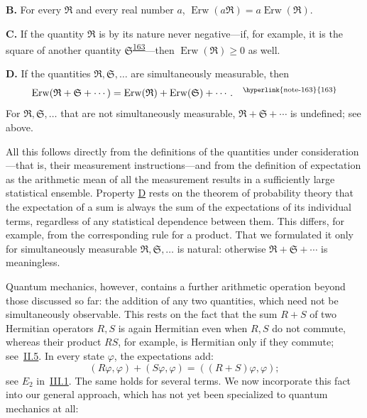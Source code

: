 \documentclass[fontsize=13pt,twoside,openany,headings=normal,parskip=false,bookmarkpackage=false,DIV=calc]{scrbook}
\begin{document}
\noindent{}\textbf{B.}\label{cond:IV.1.B} For every $\mathfrak R$ and every real number $a$, $\operatorname{Erw}(a\mathfrak R)=a\operatorname{Erw}(\mathfrak R)$.

\hypertarget{origpage-164}{}%
\noindent{}\textbf{C.}\label{cond:IV.1.C} If the quantity $\mathfrak R$ is by its nature never negative---if, for example, it is the square of another quantity $\mathfrak S$\textsuperscript{\hyperlink{note-163}{163}}---then $\operatorname{Erw}(\mathfrak R)\geq0$ as well.

\noindent{}\textbf{D.}\label{cond:IV.1.D} If the quantities $\mathfrak R,\mathfrak S,\ldots$ are simultaneously measurable, then
\[
\operatorname{Erw}(\mathfrak R+\mathfrak S+\cdots)=\operatorname{Erw}(\mathfrak R)+\operatorname{Erw}(\mathfrak S)+\cdots.
\quad\text{\textsuperscript{\hyperlink{note-163}{163}}}
\]
For $\mathfrak R,\mathfrak S,\ldots$ that are not simultaneously measurable, $\mathfrak R+\mathfrak S+\cdots$ is undefined; see above.

All this follows directly from the definitions of the quantities under consideration---that is, their measurement instructions---and from the definition of expectation as the arithmetic mean of all the measurement results in a sufficiently large statistical ensemble. Property \hyperref[cond:IV.1.D]{D} rests on the theorem of probability theory that the expectation of a sum is always the sum of the expectations of its individual terms, regardless of any statistical dependence between them. This differs, for example, from the corresponding rule for a product. That we formulated it only for simultaneously measurable $\mathfrak R,\mathfrak S,\ldots$ is natural: otherwise $\mathfrak R+\mathfrak S+\cdots$ is meaningless.

Quantum mechanics, however, contains a further arithmetic operation beyond those discussed so far: the addition of any two quantities, which need not be simultaneously observable. This rests on the fact that the sum $R+S$ of two Hermitian operators $R,S$ is again Hermitian even when $R,S$ do not commute, whereas their product $RS$, for example, is Hermitian only if they commute; see~\hyperref[sec:II.5]{II.5}. In every state $\varphi$, the expectations add:
\[
(R\varphi,\varphi)+(S\varphi,\varphi)=((R+S)\varphi,\varphi);
\]
see \hyperref[post:III.1.E2]{$E_2$} in~\hyperref[sec:III.1]{III.1}. The same holds for several terms. We now incorporate this fact into our general approach, which has not yet been specialized to quantum mechanics at all:
\end{document}
